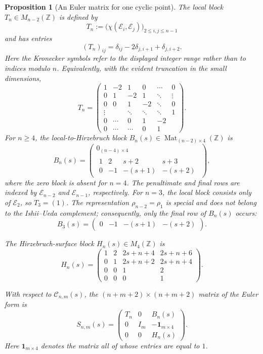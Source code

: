 \documentclass[11pt]{article}
\theoremstyle{plain}
\newtheorem{proposition}[proposition]{Proposition}
\theoremstyle{definition}
\theoremstyle{remark}
\newcommand{\Z}{\mathbb Z}
\begin{document}
\begin{proposition}[An Euler matrix for one cyclic point]
The local block \(T_n\in M_{n-2}(\Z)\) is defined by
\[
T_n
:=
\bigl(\chi(\mathcal E_i,\mathcal E_j)\bigr)_{2\leq i,j\leq n-1}
\]
and has entries
\[
(T_n)_{ij}
=
\delta_{ij}-2\delta_{j,i+1}+\delta_{j,i+2}.
\]
Here the Kronecker symbols refer to the displayed integer range rather than
to indices modulo \(n\). Equivalently, with the evident truncation in the
small dimensions,
\begin{equation}\label{eq:Tn}
T_n=
\begin{pmatrix}
1&-2&1&0&\cdots&0\\
0&1&-2&1&\ddots&\vdots\\
0&0&1&-2&\ddots&0\\
\vdots&&\ddots&\ddots&\ddots&1\\
0&\cdots&0&1&-2\\
0&\cdots&\cdots&0&1
\end{pmatrix}.
\end{equation}
For \(n\geq4\), the local-to-Hirzebruch block
\(B_n(s)\in\operatorname{Mat}_{(n-2)\times4}(\Z)\) is
\begin{equation}\label{eq:Bn}
B_n(s)
=
\begin{pmatrix}
0_{(n-4)\times4}\\[2pt]
\begin{matrix}
1&2&s+2&s+3\\
0&-1&-(s+1)&-(s+2)
\end{matrix}
\end{pmatrix},
\end{equation}
where the zero block is absent for \(n=4\). The penultimate and final rows
are indexed by \(\mathcal E_{n-2}\) and \(\mathcal E_{n-1}\), respectively.
For \(n=3\), the local block consists only of \(\mathcal E_2\), so
\(T_3=(1)\). The representation \(\rho_{n-2}=\rho_1\) is special and does
not belong to the Ishii--Ueda complement; consequently, only the final row
of \(B_n(s)\) occurs:
\[
B_3(s)
=
\begin{pmatrix}
0&-1&-(s+1)&-(s+2)
\end{pmatrix}.
\]

The Hirzebruch-surface block \(H_n(s)\in M_4(\Z)\) is
\[
H_n(s)
=
\begin{pmatrix}
1&2&2s+n+4&2s+n+6\\
0&1&2s+n+2&2s+n+4\\
0&0&1&2\\
0&0&0&1
\end{pmatrix}.
\]

With respect to \(\mathcal C_{n,m}(s)\), the \((n+m+2)\times(n+m+2)\)
matrix of the Euler form is
\[
\boxed{
S_{n,m}(s)
=
\begin{pmatrix}
T_n&0&B_n(s)\\
0&I_m&-\mathbf1_{m\times4}\\
0&0&H_n(s)
\end{pmatrix}
}.
\]
Here \(\mathbf1_{m\times4}\) denotes the matrix all of whose entries are
equal to \(1\).
\end{proposition}
\end{document}

